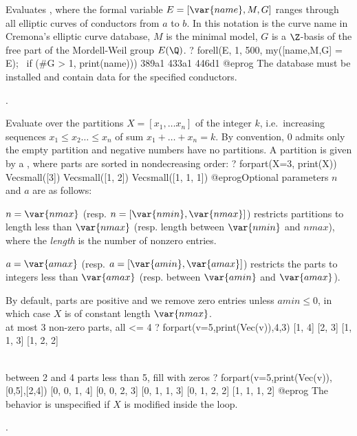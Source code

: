 \label{se:forell}
Evaluates , where the formal variable $E = [\var{name}, M, G]$
ranges through all elliptic curves of conductors from $a$ to $b$. In this
notation  is the curve name in Cremona's elliptic  curve  database,
$M$ is the minimal model, $G$ is a $\Z$-basis of the free part of the
Mordell-Weil group $E(\Q)$.
\bprog
? forell(E, 1, 500, my([name,M,G] = E); \
    if (#G > 1, print(name)))
389a1
433a1
446d1
@eprog\noindent
The  database must be installed and contain data for the
specified conductors.

.

\label{se:forpart}
Evaluate \var{seq} over the partitions $X=[x_1,\dots x_n]$ of the
integer $k$, i.e.~increasing sequences $x_1\leq x_2\dots \leq x_n$ of sum
$x_1+\dots + x_n=k$. By convention, $0$ admits only the empty partition and
negative numbers have no partitions. A partition is given by a
, where parts are sorted in nondecreasing order:
\bprog
? forpart(X=3, print(X))
Vecsmall([3])
Vecsmall([1, 2])
Vecsmall([1, 1, 1])
@eprog\noindent Optional parameters $n$ and $a$ are as follows:

\item $n=\var{nmax}$ (resp. $n=[\var{nmin},\var{nmax}]$) restricts
partitions to length less than $\var{nmax}$ (resp. length between
$\var{nmin}$ and $nmax$), where the \emph{length} is the number of nonzero
entries.

\item $a=\var{amax}$ (resp. $a=[\var{amin},\var{amax}]$) restricts the parts
to integers less than $\var{amax}$ (resp. between $\var{amin}$ and
$\var{amax}$).

By default, parts are positive and we remove zero entries unless $amin\leq0$,
in which case $X$ is of constant length $\var{nmax}$.
\bprog
\\ at most 3 non-zero parts, all <= 4
? forpart(v=5,print(Vec(v)),4,3)
[1, 4]
[2, 3]
[1, 1, 3]
[1, 2, 2]

\\ between 2 and 4 parts less than 5, fill with zeros
? forpart(v=5,print(Vec(v)),[0,5],[2,4])
[0, 0, 1, 4]
[0, 0, 2, 3]
[0, 1, 1, 3]
[0, 1, 2, 2]
[1, 1, 1, 2]
@eprog\noindent
The behavior is unspecified if $X$ is modified inside the loop.

.

